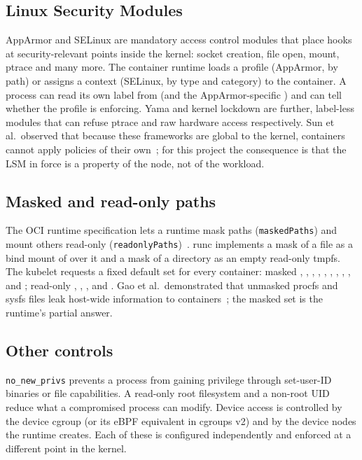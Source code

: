\subsection{Linux Security Modules}
AppArmor and SELinux are mandatory access control modules that place hooks at security-relevant points inside the kernel: socket creation, file open, mount, ptrace and many more. The container runtime loads a profile (AppArmor, by path) or assigns a context (SELinux, by type and category) to the container. A process can read its own label from  (and the AppArmor-specific ) and can tell whether the profile is enforcing. Yama and kernel lockdown are further, label-less modules that can refuse ptrace and raw hardware access respectively. Sun et al.\ observed that because these frameworks are global to the kernel, containers cannot apply policies of their own~\cite{sun2018secns}; for this project the consequence is that the LSM in force is a property of the node, not of the workload.

\subsection{Masked and read-only paths}
The OCI runtime specification lets a runtime mask paths (\texttt{maskedPaths}) and mount others read-only (\texttt{readonlyPaths})~\cite{oci-runtime}. runc implements a mask of a file as a bind mount of  over it and a mask of a directory as an empty read-only tmpfs. The kubelet requests a fixed default set for every container: masked , , , , , , , , ,  and ; read-only , , ,  and . Gao et al.\ demonstrated that unmasked procfs and sysfs files leak host-wide information to containers~\cite{gao2017containerleaks}; the masked set is the runtime's partial answer.

\subsection{Other controls}
\texttt{no\_new\_privs} prevents a process from gaining privilege through set-user-ID binaries or file capabilities. A read-only root filesystem and a non-root UID reduce what a compromised process can modify. Device access is controlled by the device cgroup (or its eBPF equivalent in cgroups v2) and by the device nodes the runtime creates. Each of these is configured independently and enforced at a different point in the kernel.

